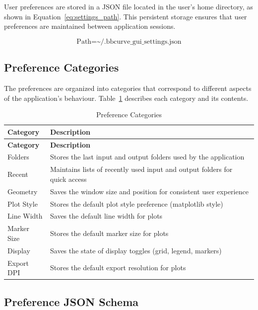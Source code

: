 \documentclass[11pt,a4paper]{article}
\begin{document}
User preferences are stored in a JSON file located in the user's home directory, as shown in Equation~\ref{eq:settings_path}. This persistent storage ensures that user preferences are maintained between application sessions.

\begin{equation}
\text{Path} = \text{\textasciitilde/.bbcurve\_gui\_settings.json}
\label{eq:settings_path}
\end{equation}

\subsection{Preference Categories}

The preferences are organized into categories that correspond to different aspects of the application's behaviour. Table~\ref{tab:preferences} describes each category and its contents.

\begin{longtable}{p{4cm}p{10cm}}
\caption{Preference Categories}\label{tab:preferences}\\
\toprule
\textbf{Category} & \textbf{Description} \\
\midrule
\endfirsthead
\toprule
\textbf{Category} & \textbf{Description} \\
\midrule
\endhead
Folders & Stores the last input and output folders used by the application \\
Recent & Maintains lists of recently used input and output folders for quick access \\
Geometry & Saves the window size and position for consistent user experience \\
Plot Style & Stores the default plot style preference (matplotlib style) \\
Line Width & Saves the default line width for plots \\
Marker Size & Stores the default marker size for plots \\
Display & Saves the state of display toggles (grid, legend, markers) \\
Export DPI & Stores the default export resolution for plots \\
\bottomrule
\end{longtable}

\subsection{Preference JSON Schema}
\end{document}
